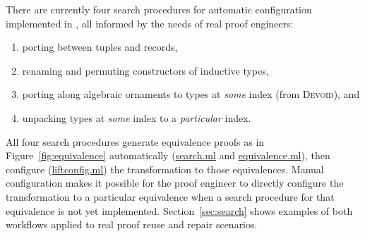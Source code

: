 There are currently four search procedures for automatic configuration implemented in \toolname,
all informed by the needs of real proof engineers:

\begin{enumerate}
\item porting between tuples and records,
\item renaming and permuting constructors of inductive types,
\item porting along algebraic ornaments to types at \textit{some} index (from \textsc{Devoid}), and
\item unpacking types at \textit{some} index to a \textit{particular} index.
\end{enumerate}
All four search procedures generate equivalence proofs as in Figure~\ref{fig:equivalence} automatically (\href{https://github.com/uwplse/pumpkin-pi/blob/master/plugin/src/automation/search/search.ml}{search.ml} and \href{https://github.com/uwplse/pumpkin-pi/blob/master/plugin/src/automation/search/equivalence.ml}{equivalence.ml}),
then configure (\href{https://github.com/uwplse/pumpkin-pi/blob/master/plugin/src/automation/lift/liftconfig.ml}{liftconfig.ml}) the transformation to those equivalences.
Manual configuration makes it possible
for the proof engineer to directly configure the transformation to a particular equivalence
when a search procedure for that equivalence is not yet implemented.
Section~\ref{sec:search} shows examples of both workflows applied to real proof reuse and repair scenarios.




